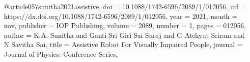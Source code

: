 @article{057sunitha2021assistive,
doi = {10.1088/1742-6596/2089/1/012056},
url = {https://dx.doi.org/10.1088/1742-6596/2089/1/012056},
year = {2021},
month = {nov},
publisher = {IOP Publishing},
volume = {2089},
number = {1},
pages = {012056},
author = {K.A. Sunitha and Ganti Sri Giri Sai Suraj and G Atchyut Sriram and N Savitha Sai},
title = {Assistive Robot For Visually Impaired People},
journal = {Journal of Physics: Conference Series},
}